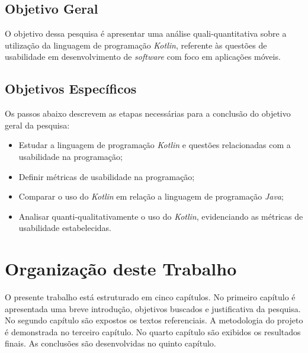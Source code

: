 \subsection{Objetivo Geral}

O objetivo dessa pesquisa é apresentar uma análise quali-quantitativa sobre a utilização da linguagem de programação \textit{Kotlin}, referente às questões de usabilidade em desenvolvimento de \textit{software} com foco em aplicações móveis.%


\subsection{Objetivos Específicos}

Os passos abaixo descrevem as etapas necessárias para a conclusão do objetivo geral da pesquisa:

\begin{itemize}
	\item Estudar a linguagem de programação \textit{Kotlin} e questões relacionadas com a usabilidade na programação;
	\item Definir métricas de usabilidade na programação;
	\item Comparar o uso do \textit{Kotlin} em relação a linguagem de programação \textit{Java};
	\item Analisar quanti-qualitativamente o uso do \textit{Kotlin}, evidenciando as métricas de usabilidade estabelecidas.
\end{itemize}

\section{Organização deste Trabalho}

O presente trabalho está estruturado em cinco capítulos. No primeiro capítulo é apresentada uma breve introdução, objetivos buscados e justificativa da pesquisa. No segundo capítulo são expostos os textos referenciais. A metodologia do projeto é demonstrada no terceiro capítulo. No quarto capítulo são exibidos os resultados finais. As conclusões são desenvolvidas no quinto capítulo.
